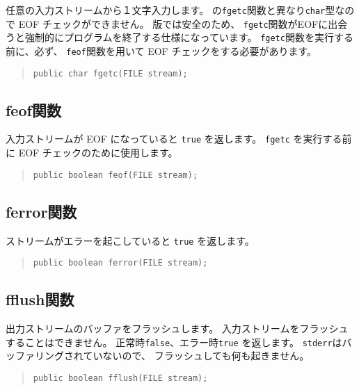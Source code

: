 任意の入力ストリームから１文字入力します。
\cl の\verb/fgetc/関数と異なり\verb/char/型なので EOF チェックができません。
\tac 版では安全のため、
\verb/fgetc/関数がEOFに出会うと強制的にプログラムを終了する仕様になっています。
\verb/fgetc/関数を実行する前に、必ず、
\verb/feof/関数を用いて EOF チェックをする必要があります。

\begin{quote}
\begin{verbatim}
public char fgetc(FILE stream);
\end{verbatim}
\end{quote}

\subsection{feof関数}

入力ストリームが EOF になっていると \verb/true/ を返します。
\verb/fgetc/ を実行する前に EOF チェックのために使用します。

\begin{quote}
\begin{verbatim}
public boolean feof(FILE stream);
\end{verbatim}
\end{quote}

\subsection{ferror関数}

ストリームがエラーを起こしていると \verb/true/ を返します。

\begin{quote}
\begin{verbatim}
public boolean ferror(FILE stream);
\end{verbatim}
\end{quote}

\subsection{fflush関数}

出力ストリームのバッファをフラッシュします。
入力ストリームをフラッシュすることはできません。
正常時\verb/false/、エラー時\verb/true/ を返します。
\verb/stderr/はバッファリングされていないので、
フラッシュしても何も起きません。

\begin{quote}
\begin{verbatim}
public boolean fflush(FILE stream);
\end{verbatim}
\end{quote}

